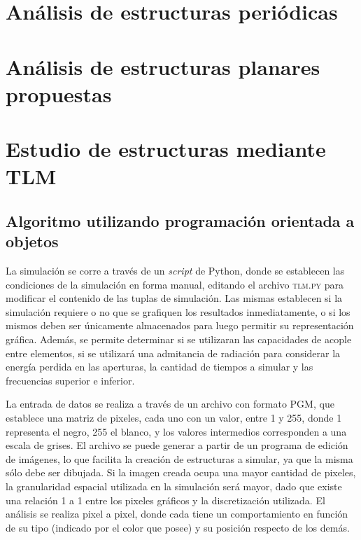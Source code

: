
\section{Análisis de estructuras periódicas}
\label{sec_estructuras_periodicas}
\lipsum
\section{Análisis de estructuras planares propuestas}
\label{sec_estructuras_propuestas}
\lipsum
\lipsum
\section{Estudio de estructuras mediante TLM}
\label{sec_estudio_tlm}
\lipsum

\subsection{Algoritmo utilizando programación orientada a objetos}
\label{subsec_estudio_tlm}
La simulación se corre a través de un \textit{script} de Python, donde se establecen las condiciones de la simulación en forma manual, editando el archivo \textsc{tlm.py} para modificar el contenido de las tuplas de simulación. Las mismas establecen si la simulación requiere o no que se grafiquen los resultados inmediatamente, o si los mismos deben ser únicamente almacenados para luego permitir su representación gráfica. Además, se permite determinar si se utilizaran las capacidades de acople entre elementos, si se utilizará una admitancia de radiación para considerar la energía perdida en las aperturas, la cantidad de tiempos a simular y las frecuencias superior e inferior.

La entrada de datos se realiza a través de un archivo con formato PGM, que establece una matriz de pixeles, cada uno con un valor, entre 1 y 255, donde 1 representa el negro, 255 el blanco, y los valores intermedios corresponden a una escala de grises. El archivo se puede generar a partir de un programa de edición de imágenes, lo que facilita la creación de estructuras a simular, ya que la misma sólo debe ser dibujada. Si la imagen creada ocupa una mayor cantidad de pixeles, la granularidad espacial utilizada en la simulación será mayor, dado que existe una relación 1 a 1 entre los pixeles gráficos y la discretización utilizada. El análisis se realiza pixel a pixel, donde cada tiene un comportamiento en función de su tipo (indicado por el color que posee) y su posición respecto de los demás.

